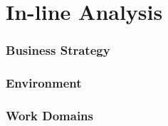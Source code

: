 
\part{In-line Analysis}


\section{Business Strategy}

\section{Environment}

\section{Work Domains}


